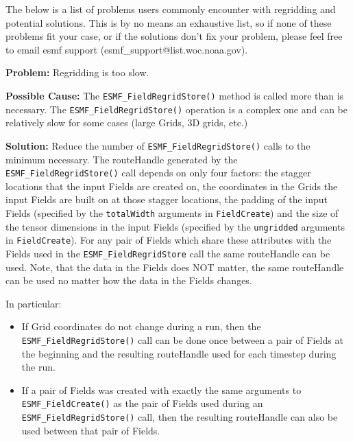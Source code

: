  The below is a list of problems users commonly encounter with regridding and potential solutions. 
 This is by no means an exhaustive list, so if none of these problems fit your case, or if the solutions
 don't fix your problem, please feel free to email esmf support (esmf\_support@list.woc.noaa.gov).

 \bigskip
 
 {\bf Problem:} Regridding is too slow.

 \medskip

 {\bf Possible Cause:} The {\tt ESMF\_FieldRegridStore()} method is called more than is necessary. \newline
 The {\tt ESMF\_FieldRegridStore()} operation is a complex one and can be 
 relatively slow for some cases (large Grids, 3D grids, etc.) 
 
 \smallskip

 {\bf Solution:} Reduce the number of {\tt ESMF\_FieldRegridStore()} calls to the minimum necessary. The
 routeHandle generated by the {\tt ESMF\_FieldRegridStore()} call depends on only four factors: the 
 stagger locations that the input Fields are created on, the coordinates in the Grids the input Fields
 are built on at those stagger locations, the padding of the input Fields 
 (specified by the {\tt totalWidth} arguments in {\tt FieldCreate}) and the size of the tensor
 dimensions in the input Fields (specified by the {\tt ungridded} arguments in {\tt FieldCreate}). 
 For any pair of Fields which share these attributes with the Fields used in the
 {\tt ESMF\_FieldRegridStore} call  the same routeHandle can be used. Note, that the data in the 
 Fields does NOT matter, the same routeHandle can be used no matter how the data in the Fields changes.

 \smallskip

 In particular:
 \begin{itemize}

 \item If Grid coordinates do not change during a run, then the {\tt ESMF\_FieldRegridStore()} call can be
 done once between a pair of Fields at the beginning and the resulting routeHandle used for each 
 timestep during the run. 

 \item If a pair of Fields was created with exactly the same arguments to {\tt ESMF\_FieldCreate()} as the 
 pair of Fields used during an {\tt ESMF\_FieldRegridStore()} call, then the resulting routeHandle can 
 also be used between that pair of Fields. 
 \end{itemize}

